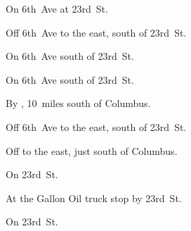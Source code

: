 
\begin{LocationList}

On 6th~Ave at  23rd~St.

Off 6th~Ave to the east, south of  23rd~St.

On 6th~Ave south of  23rd~St.

On 6th~Ave south of  23rd~St.

By , 10~miles south of Columbus.

Off 6th~Ave to the east, south of  23rd~St.

Off   to the east, just south of Columbus.

\Location{\TruckService \Service}
On  23rd~St.

At the Gallon Oil truck stop by  23rd~St.

On  23rd~St.

\end{LocationList}
